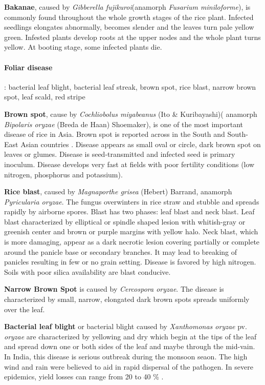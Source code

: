 \textbf{Bakanae}, caused by \textit{Gibberella fujikuroi}(anamorph \textit{Fusarium miniloforme}), is commonly found throughout the whole growth stages of the rice plant. Infected seedlings elongates abnormally, becomes slender and the leaves turn pale yellow green. Infested plants develop roots at the upper nodes and the whole plant turns yellow. At booting stage, some infected plants die. 

\paragraph{Foliar disease}: bacterial leaf blight, bacterial leaf streak, brown spot, rice blast, narrow brown spot, leaf scald, red stripe

\textbf{Brown spot}, cause by \textit{Cochliobolus miyabeanus} (Ito \& Kuribayashi)( anamorph \textit{Bipolaris oryzae} (Breda de Haan) Shoemaker), is one of the most important disease of rice in Asia. Brown spot is reported across in the South and South-East Asian countries \citep{barnwal2013review}. Disease appears as small oval or circle, dark brown spot on leaves or glumes. Disease is seed-transmitted and infected seed is primary inoculum. Disease develops very fast at fields with poor fertility conditions (low nitrogen, phosphorus and potassium). 

\textbf{Rice blast}, caused by \textit{Magnaporthe grisea} (Hebert) Barrand, anamorph \textit{Pyricularia oryzae}. The fungus overwinters in rice straw and stubble and spreads rapidly by airborne spores. Blast has two phases: leaf blast and neck blast. Leaf blast characterized by elliptical or spindle shaped lesion with whitish-gray or greenish center and brown or purple margins with yellow halo. Neck blast, which is more damaging, appear as a dark necrotic lesion covering partially or complete around the panicle base or secondary branches. It may lead to breaking of panicles resulting in few or no grain setting. Disease is favored by high nitrogen. Soils with poor silica availability are blast conducive. 

\textbf{Narrow Brown Spot} is caused by \textit{Cercospora oryzae}. The disease is characterized by small, narrow, elongated dark brown spots spreads uniformly over the leaf. 

\textbf{Bacterial leaf blight} or bacterial blight caused by \textit{Xanthomonas oryzae} pv. \textit{oryzae} are characterized by yellowing and dry which  begin at the tips of the leaf and spread down one or both sides of the leaf and maybe through the mid-vain. In India, this disease is serious outbreak during the monsoon seaon. The high wind and rain were believed to aid in rapid dispersal of the pathogen. In severe epidemics, yield losses can range from 20 to 40 \% \citep{sonti1998bacterial}.

